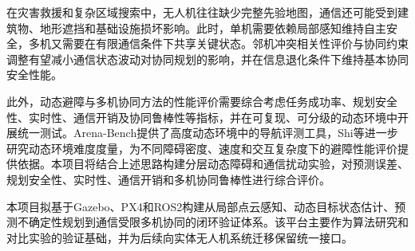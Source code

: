 在灾害救援和复杂区域搜索中，无人机往往缺少完整先验地图，通信还可能受到建筑物、地形遮挡和基础设施损坏影响。此时，单机需要依赖局部感知维持自主安全，多机又需要在有限通信条件下共享关键状态。邻机冲突相关性评价与协同约束调整有望减小通信状态波动对协同规划的影响，并在信息退化条件下维持基本协同安全性能。

此外，动态避障与多机协同方法的性能评价需要综合考虑任务成功率、规划安全性、实时性、通信开销及协同鲁棒性等指标，并在可复现、可分级的动态环境中开展统一测试。Arena-Bench\cite{kastner2022arenabench}提供了高度动态环境中的导航评测工具，Shi等\cite{shi2024difficulty}进一步研究动态环境难度度量，为不同障碍密度、速度和交互复杂度下的避障性能评价提供依据。本项目将结合上述思路构建分层动态障碍和通信扰动实验，对预测误差、规划安全性、实时性、通信开销和多机协同鲁棒性进行综合评价。

本项目拟基于Gazebo、PX4和ROS2构建从局部点云感知、动态目标状态估计、预测不确定性规划到通信受限多机协同的闭环验证体系。该平台主要作为算法研究和对比实验的验证基础，并为后续向实体无人机系统迁移保留统一接口。
